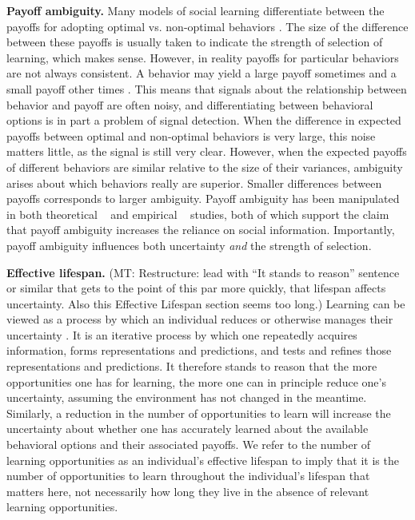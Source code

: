 \documentclass[letterpaper,11.5pt]{scrartcl}
\newcommand{\mt}[1]{{\textcolor{myorange} {({\tiny MT:} #1)}}}
\begin{document}
\textbf{Payoff ambiguity.}
Many models of social learning differentiate between the payoffs for adopting optimal vs. non-optimal behaviors \cite{Rogers1988,Enquist2007,Rendell2010}. The size of the difference between these payoffs is usually taken to indicate the strength of selection of learning, which makes sense. However, in reality payoffs for particular behaviors are not always consistent. A behavior may yield a large payoff sometimes and a small payoff other times \cite{McElreath2005}. This means that signals about the relationship between behavior and payoff are often noisy, and differentiating between behavioral options is in part a problem of signal detection.
When the difference in expected payoffs between optimal and non-optimal behaviors is very large, this noise matters little, as the signal is still very clear. However, when the expected payoffs of different behaviors are similar relative to the size of their variances, ambiguity arises about which behaviors really are superior. Smaller differences between payoffs corresponds to larger ambiguity. Payoff ambiguity has been manipulated in both theoretical ~\cite{perreault2012bayesian} and empirical ~\cite{McElreath2005, Morgan2012} studies, both of which support the claim that payoff ambiguity increases the reliance on social information. Importantly, payoff ambiguity %
influences both uncertainty \emph{and} the strength of selection. %

\textbf{Effective lifespan.}
\mt{Restructure: lead with ``It stands to reason'' sentence or similar that gets
to the point of this par more quickly, that lifespan affects uncertainty. Also this Effective
Lifespan section seems too long.}
Learning can be viewed as a process by which an individual reduces or otherwise manages their uncertainty \cite{jacobs2011bayesian,clark2013whatever}. It is an iterative process by which one repeatedly acquires information, forms representations and predictions, and tests and refines those representations and predictions. It therefore stands to reason that the more opportunities one has for learning, the more one can in principle reduce one's uncertainty, assuming the environment has not changed in the meantime. Similarly, a reduction in the number of opportunities to learn will increase the uncertainty about whether one has accurately learned about the available behavioral options and their associated payoffs. We refer to the number of learning opportunities as an individual's effective lifespan to imply that it is the number of opportunities to learn throughout the individual's lifespan that matters here, not necessarily how long they live in the absence of relevant learning opportunities.  
\end{document}
